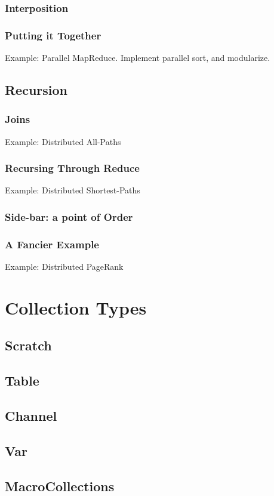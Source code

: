 \documentclass[]{book}
\begin{document}
        \subsection{Interposition}
        \subsection{Putting it Together}
        Example: Parallel MapReduce.  Implement parallel sort, and modularize.
    \section{Recursion}
        \subsection{Joins}
        Example: Distributed All-Paths
        \subsection{Recursing Through Reduce}
        Example: Distributed Shortest-Paths
        \subsection{Side-bar: a point of Order}
        \subsection{A Fancier Example}
        Example: Distributed PageRank

\chapter{Collection Types}
    \section{Scratch}
    \section{Table}
    \section{Channel}
    \section{Var}
    \section{MacroCollections}
\end{document}
